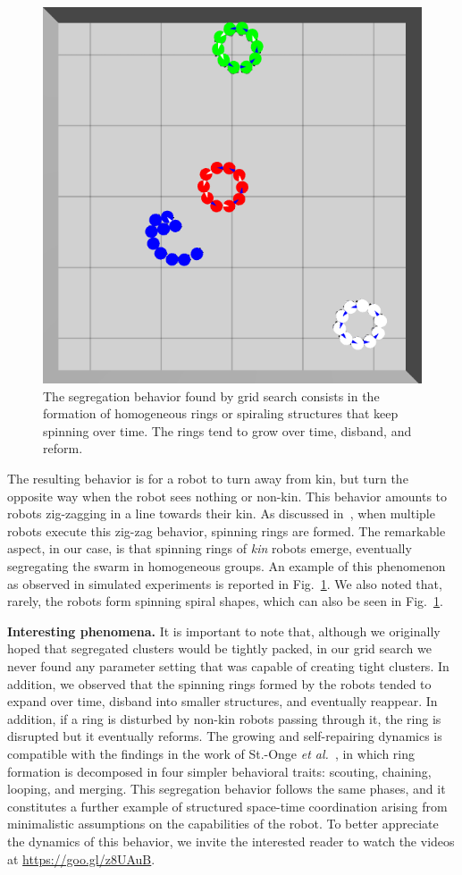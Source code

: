 \documentclass[conference]{IEEEtran}
\newcommand{\myparagraph}[1]{\textbf{#1.}}
\begin{document}
\begin{figure}[t]
  \centering
  \includegraphics[width=0.5\linewidth]{./images/rings_example.png}
  \caption{The segregation behavior found by grid search consists in the
    formation of homogeneous rings or spiraling structures that keep spinning
    over time. The rings tend to grow over time, disband, and reform.}
  \label{fig:rings}
\end{figure}
The resulting behavior is for a robot to turn away from kin, but turn the
opposite way when the robot sees nothing or non-kin. This behavior amounts to
robots zig-zagging in a line towards their kin. As discussed
in~\cite{StOnge:IROS2018}, when multiple robots execute this zig-zag behavior,
spinning rings are formed. The remarkable aspect, in our case, is that spinning
rings of \emph{kin} robots emerge, eventually segregating the swarm in
homogeneous groups. An example of this phenomenon as observed in simulated
experiments is reported in Fig.~\ref{fig:rings}. We also noted that, rarely, the
robots form spinning spiral shapes, which can also be seen in
Fig.~\ref{fig:rings}.

\myparagraph{Interesting phenomena}
It is important to note that, although we originally hoped that segregated
clusters would be tightly packed, in our grid search we never found any
parameter setting that was capable of creating tight clusters. In addition, we
observed that the spinning rings formed by the robots tended to expand over
time, disband into smaller structures, and eventually reappear. In addition, if
a ring is disturbed by non-kin robots passing through it, the ring is disrupted
but it eventually reforms. The growing and self-repairing dynamics is compatible
with the findings in the work of St.-Onge \emph{et al.}~\cite{StOnge:IROS2018},
in which ring formation is decomposed in four simpler behavioral traits:
scouting, chaining, looping, and merging. This segregation behavior follows the
same phases, and it constitutes a further example of structured space-time
coordination arising from minimalistic assumptions on the capabilities of the
robot. To better appreciate the dynamics of this behavior, we invite the
interested reader to watch the videos at
\href{https://www.youtube.com/playlist?list=PL9HqYJ1IkIKVX9EsT5BY9LnBsBPTjc5bB}{https://goo.gl/z8UAuB}.
\end{document}
